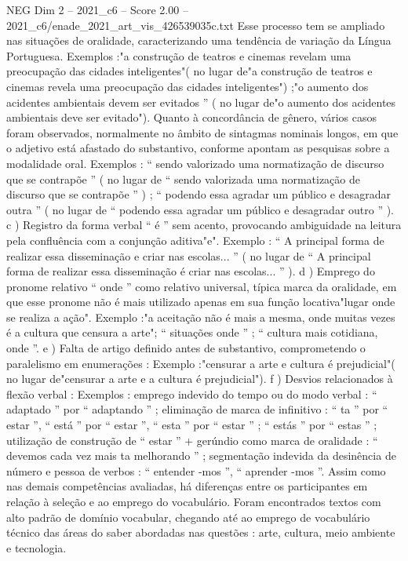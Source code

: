 \begin{textsample}{NEG Dim 2 – 2021\_c6 – Score 2.00 – 2021\_c6/enade\_2021\_art\_vis\_426539035c.txt}
Esse processo tem se ampliado nas situações de oralidade, caracterizando uma tendência de variação da Língua Portuguesa.
Exemplos :"a construção de teatros e cinemas revelam uma preocupação das cidades inteligentes"( no lugar de"a construção de teatros e cinemas revela uma preocupação das cidades inteligentes") ;"o aumento dos acidentes ambientais devem ser evitados ” ( no lugar de"o aumento dos acidentes ambientais deve ser evitado").
Quanto à concordância de gênero, vários casos foram observados, normalmente no âmbito de sintagmas nominais longos, em que o adjetivo está afastado do substantivo, conforme apontam as pesquisas sobre a modalidade oral.
Exemplos : “ sendo valorizado uma normatização de discurso que se contrapõe ” ( no lugar de “ sendo valorizada uma normatização de discurso que se contrapõe ” ) ; “ podendo essa agradar um público e desagradar outra ” ( no lugar de “ podendo essa agradar um público e desagradar outro ” ). c ) Registro da forma verbal “ é ” sem acento, provocando ambiguidade na leitura pela confluência com a conjunção aditiva"e".
Exemplo : “ A principal forma de realizar essa disseminação e criar nas escolas... ” ( no lugar de “ A principal forma de realizar essa disseminação é criar nas escolas... ” ). d ) Emprego do pronome relativo “ onde ” como relativo universal, típica marca da oralidade, em que esse pronome não é mais utilizado apenas em sua função locativa"lugar onde se realiza a ação".
Exemplo :"a aceitação não é mais a mesma, onde muitas vezes é a cultura que censura a arte"; “ situações onde ” ; “ cultura mais cotidiana, onde ”. e ) Falta de artigo definido antes de substantivo, comprometendo o paralelismo em enumerações : Exemplo :"censurar a arte e cultura é prejudicial"( no lugar de"censurar a arte e a cultura é prejudicial"). f ) Desvios relacionados à flexão verbal : Exemplos : emprego indevido do tempo ou do modo verbal : “ adaptado ” por “ adaptando ” ; eliminação de marca de infinitivo : “ ta ” por “ estar ”, “ está ” por “ estar ”, “ esta ” por “ estar ” ; “ estás ” por “ estas ” ; utilização de construção de “ estar ” + gerúndio como marca de oralidade : “ devemos cada vez mais ta melhorando ” ; segmentação indevida da desinência de número e pessoa de verbos : “ entender -mos ”, “ aprender -mos ”.
Assim como nas demais competências avaliadas, há diferenças entre os participantes em relação à seleção e ao emprego do vocabulário.
Foram encontrados textos com alto padrão de domínio vocabular, chegando até ao emprego de vocabulário técnico das áreas do saber abordadas nas questões : arte, cultura, meio ambiente e tecnologia.

\end{textsample}
